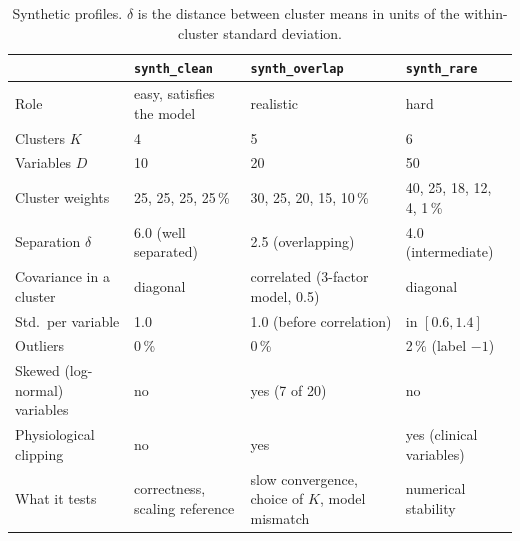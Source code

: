 \documentclass[conference]{IEEEtran}
\begin{document}
\begin{table}[p]
\centering
\caption{Synthetic profiles. $\delta$ is the distance between cluster means in units of the within-cluster standard deviation.}
\label{tab:synth-profiles}
\footnotesize
\setlength{\tabcolsep}{3pt}
\begin{tabular}{llll}
\toprule
 & \texttt{synth\_clean} & \texttt{synth\_overlap} & \texttt{synth\_rare} \\
\midrule
Role & easy, satisfies the model & realistic & hard \\
Clusters $K$ & 4 & 5 & 6 \\
Variables $D$ & 10 & 20 & 50 \\
Cluster weights & 25, 25, 25, 25\,\% & 30, 25, 20, 15, 10\,\% & 40, 25, 18, 12, 4, 1\,\% \\
Separation $\delta$ & 6.0 (well separated) & 2.5 (overlapping) & 4.0 (intermediate) \\
Covariance in a cluster & diagonal & correlated (3-factor model, 0.5) & diagonal \\
Std.\ per variable & 1.0 & 1.0 (before correlation) & in $[0.6, 1.4]$ \\
Outliers & 0\,\% & 0\,\% & 2\,\% (label $-1$) \\
Skewed (log-normal) variables & no & yes (7 of 20) & no \\
Physiological clipping & no & yes & yes (clinical variables) \\
What it tests & correctness, scaling reference & slow convergence, choice of $K$, model mismatch & numerical stability \\
\bottomrule
\end{tabular}
\end{table}
\clearpage
\end{document}

